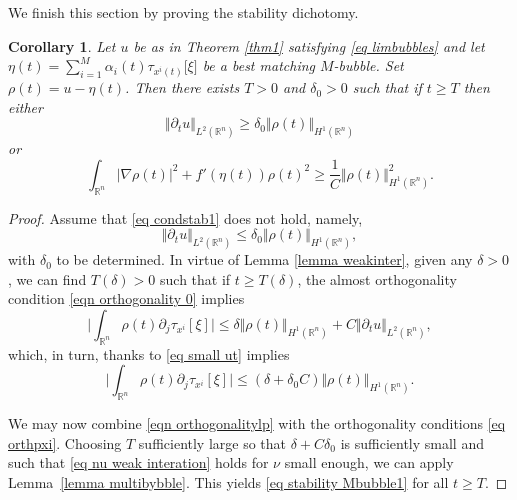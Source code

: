 \documentclass[11pt,letterpaper,reqno]{amsart}
\newcommand{\R}{\mathbb{R}}
\theoremstyle{plain}%
\newtheorem{corollary}[theorem]{Corollary}
\theoremstyle{definition}
\numberwithin{equation}{section}
\numberwithin{figure}{section}
\begin{document}
We finish this section by proving the stability dichotomy.
\begin{corollary}\label{cor stabilitydich}
   Let $u$ be as in Theorem \ref{thm1} satisfying \eqref{eq limbubbles} and let $\eta(t) = \sum_{i=1}^M \alpha_i(t)\tau_{x^i(t)}\big[\xi\big]$ be a best matching $M$-bubble. Set $\rho(t)=u-\eta(t)$. Then there exists $T>0$ and $\delta_0>0$ such that if $t\geq T$ then either 
    \begin{equation}\label{eq condstab1}
        \Vert \partial_t u\Vert_{L^2(\R^n)} \geq \delta_0 \Vert \rho(t)\Vert_{H^1(\R^n)}
    \end{equation} 
    or
	\begin{equation}\label{eq stability Mbubble1}
		\int_{\R^n}   |\nabla \rho(t)|^2 + f'(\eta(t)) \rho(t)^2 \geq \frac{1}{C}\Vert \rho(t)\Vert_{H^1(\R^n)}^2.
	\end{equation}
\end{corollary}
\begin{proof}
Assume that \eqref{eq condstab1} does not hold, namely, 
\begin{equation}\label{eq small ut}
       \Vert \partial_t u\Vert_{L^2(\R^n)} \leq \delta_0 \Vert \rho(t)\Vert_{H^1(\R^n)},
\end{equation}
with $\delta_0$ to be determined. In virtue of Lemma \ref{lemma weakinter}, given any $\delta>0$, we can find $T(\delta)>0$ such that if $t\geq T(\delta)$, the almost orthogonality condition \eqref{eqn orthogonality 0} implies
\begin{equation*}
		\Bigg|\int_{\R^n} \rho(t) \partial_j \tau_{x^i}[\xi]\Bigg|\leq \delta \Vert \rho(t)\Vert_{H^1(\R^n)} +C \Vert \partial_t u\Vert_{L^2(\R^n)},
	\end{equation*}
which, in turn, thanks to \eqref{eq small ut} implies
\begin{equation}\label{eqn orthogonalitylp}
		\Bigg|\int_{\R^n} \rho(t) \partial_j \tau_{x^i}[\xi]\Bigg|\leq (\delta+\delta_0 C) \Vert \rho(t)\Vert_{H^1(\R^n)}.
	\end{equation}
 
We may now combine \eqref{eqn orthogonalitylp} with the orthogonality conditions \eqref{eq orthpxi}.  Choosing $T$ sufficiently large so that $\delta + C\delta_0$ is sufficiently small and such that \eqref{eq nu weak interation} holds for $\nu$ small enough, we can apply Lemma~\ref{lemma multibybble}.  This yields \eqref{eq stability Mbubble1} for all $t\geq T$.
\end{proof}
	
	
	
\end{document}
